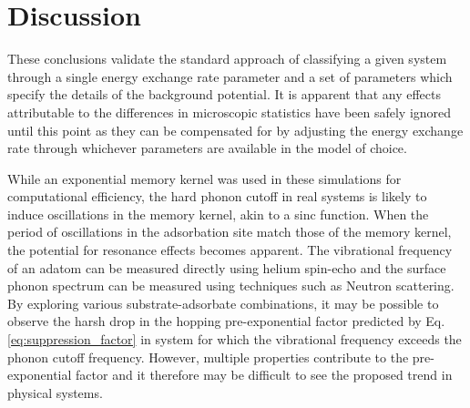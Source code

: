 \documentclass[7pt]{article}
\begin{document}
\section*{Discussion}

These conclusions validate the standard approach of classifying a given system through a single energy exchange rate parameter and a set of parameters which specify the details of the background potential. It is apparent that any effects attributable to the differences in microscopic statistics have been safely ignored until this point as they can be compensated for by adjusting the energy exchange rate through whichever parameters are available in the model of choice.

While an exponential memory kernel was used in these simulations for computational efficiency, the hard phonon cutoff in real systems is likely to induce oscillations in the memory kernel, akin to a sinc function. When the period of oscillations in the adsorbation site match those of the memory kernel, the potential for resonance effects becomes apparent. The vibrational frequency of an adatom can be measured directly using helium spin-echo and the surface phonon spectrum can be measured using techniques such as Neutron scattering\cite{Sinha}. By exploring various substrate-adsorbate combinations, it may be possible to observe the harsh drop in the hopping pre-exponential factor predicted by Eq. \ref{eq:suppression_factor} in system for which the vibrational frequency exceeds the phonon cutoff frequency. However, multiple properties contribute to the pre-exponential factor and it therefore may be difficult to see the proposed trend in physical systems. 



\end{document}
